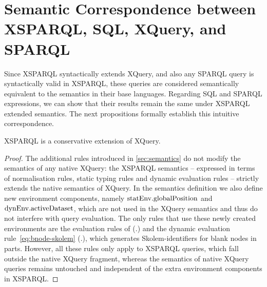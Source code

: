 \section{Semantic Correspondence between XSPARQL, SQL, XQuery, and SPARQL}
\label{sec:correspondence}
%
Since XSPARQL syntactically extends XQuery, and also any SPARQL \CONSTRUCT query is syntactically valid in XSPARQL,
these queries are considered semantically equivalent to the semantics in their base languages.
%
Regarding \ac{SQL} and SPARQL \SELECT expressions, we can show that their results remain the same under XSPARQL extended
semantics.
%
The next propositions formally establish this intuitive correspondence.

\begin{proposition}
\label{prop:xsparql}
  XSPARQL is a conservative extension of XQ\-uery.
\end{proposition}
%
\begin{proof}
  The additional rules introduced in \cref{sec:semantics} do not modify the semantics of any native XQuery: the
  XSPARQL semantics -- expressed in terms of normalisation rules, static typing rules and dynamic evaluation rules --
  strictly extends the native semantics of XQuery.
  In the semantics definition we also define new environment components, namely $\mathrm{statEnv}.\textrm{globalPosition}$ and
  ${\textrm{dynEnv}}.\textrm{activeDataset}$, which are not used in the XQuery semantics and thus do not interfere with query
  evaluation.
  The only rules that use these newly created environments are the evaluation rules of 
  (\dyn.) and the dynamic evaluation rule~\eqref{eq:bnode-skolem} (\dyn.),
  which generates Skolem-identifiers for blank nodes in \CONSTRUCT parts.
  However, all these rules only apply to XSPARQL queries, which fall outside the native XQuery fragment, whereas the
  semantics of native XQuery queries remains untouched and independent of the extra environment components in XSPARQL.
\end{proof}


